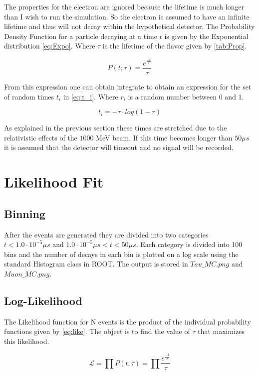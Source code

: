 \documentclass[aps,prl,groupedaddress]{revtex4}
\begin{document}
The properties for the electron are ignored because the lifetime is much longer than I wish to run the simulation. So the electron is assumed to have an infinite lifetime and thus will not decay within the hypothetical detector. The Probability Density Function for a particle decaying at a time $t$ is given by the Exponential distribution \ref{eq:Expo}. Where $\tau$ is the lifetime of the flavor given by \ref{tab:Prop}.

\begin{equation}
\label{eq:Expo}
P(t;\tau) = \frac{e^{\frac{-t}{\tau}}}{\tau}
\end{equation}

From this expression one can obtain integrate to obtain an expression for the set of random times $t_{i}$ in \ref{eq:t_i}. Where $r_{i}$ is a random number between 0 and 1. 

\begin{equation}
\label{eq:t_i}
t_{i} = -\tau \cdot log(1-r)
\end{equation}

As explained in the previous section these times are stretched due to the relativistic effects of the $1000$ MeV beam. If this time becomes longer than $50 \mu s$ it is assumed that the detector will timeout and no signal will be recorded.

\section{Likelihood Fit}
\subsection{Binning}
After the events are generated they are divided into two categories $t < 1.0\cdot10^{-5} \mu s$ and $1.0\cdot10^{-5} \mu s < t < 50 \mu s$. Each category is divided into 100 bins and the number of decays in each bin is plotted on a log scale using the standard Histogram class in ROOT. The output is stored in $Tau\_MC.png$ and $Muon\_MC.png$.

\subsection{Log-Likelihood}
The Likelihood function for N events is the product of the individual probability functions given by \ref{eq:like}. The object is to find the value of $\tau$ that maximizes this likelihood.

\begin{equation}
\label{eq:like}
\mathcal{L} = \prod P(t;\tau) = \prod \frac{e^{\frac{-t}{\tau}}}{\tau}
\end{equation}
\end{document}
